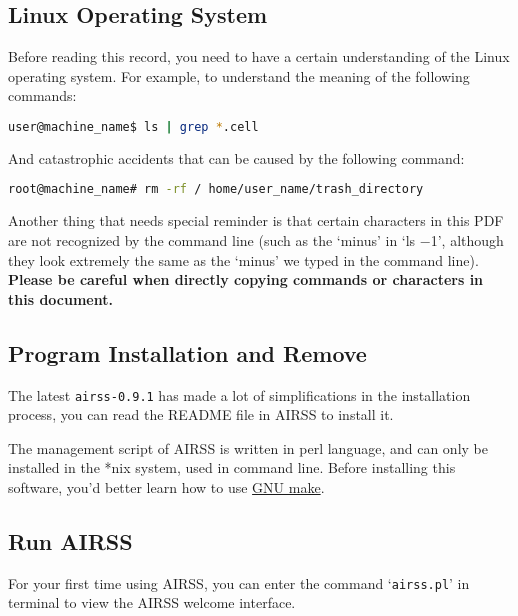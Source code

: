 \documentclass[a4paper, 10pt]{article}
\begin{document}
\subsection{Linux Operating System} 
Before reading this record, you need to have a certain understanding of the Linux operating system. For example, to understand the meaning of the following commands:
\begin{lstlisting}[language={bash}]
user@machine_name$ ls | grep *.cell
\end{lstlisting}

And catastrophic accidents that can be caused by the following command:
\begin{lstlisting}[language={bash}]
root@machine_name# rm -rf / home/user_name/trash_directory
\end{lstlisting}

Another thing that needs special reminder is that certain characters in this PDF are not recognized by the command line (such as the `minus' in `ls  \(-\)1', although they look extremely the same as the `minus' we typed in the command line). \textbf{Please be careful when directly copying commands or characters in this document.}

\subsection{Program Installation and Remove}

The latest \verb|airss-0.9.1| has made a lot of simplifications in the installation process, you can read the  README file in AIRSS to install it.

The management script of AIRSS is written in perl language, and can only be installed in the *nix system, used in command line. Before installing this software, you'd better learn how to use \href{https://www.gnu.org/software/make/manual/}{GNU make}.

\subsection{Run AIRSS}
For your first time using AIRSS, you can enter the command `\verb|airss.pl|' in terminal to view the AIRSS welcome interface.
\end{document}
